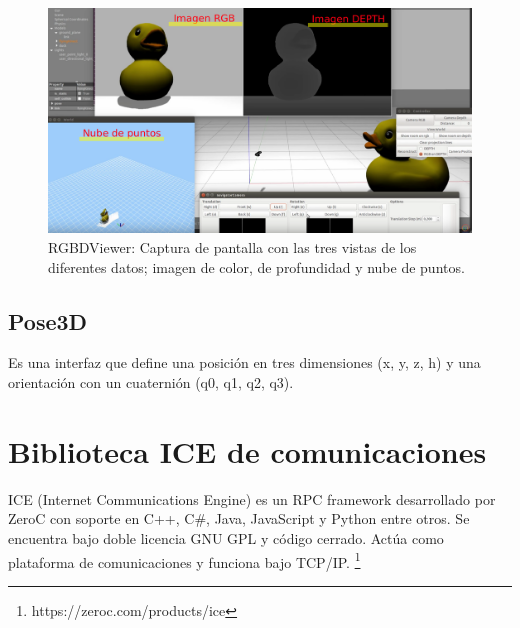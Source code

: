\begin{figure}[th]
\centering
\includegraphics[scale=0.2]{Figures/rgbdviewer2.png}
\decoRule
\caption[Captura de RGBDViewer]{RGBDViewer: Captura de pantalla con las tres vistas de los diferentes datos; imagen de color, de profundidad y nube de puntos.}
\label{fig:RgbdViewer}
\end{figure}

\subsection{Pose3D}

Es una interfaz que define una posición en tres dimensiones (x, y, z, h) y una orientación con un cuaternión (q0, q1, q2, q3).



\section{Biblioteca ICE de comunicaciones}

ICE (Internet Communications Engine) es un RPC framework desarrollado por ZeroC con soporte en C++, C\#, Java, JavaScript y Python entre otros. Se encuentra bajo doble licencia GNU GPL y código cerrado. Actúa como plataforma de comunicaciones y funciona bajo TCP/IP. \footnote{https://zeroc.com/products/ice}

